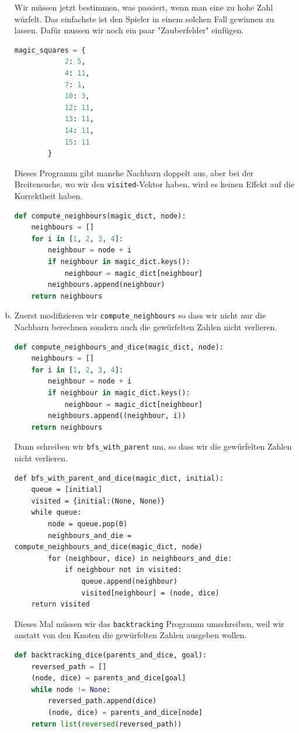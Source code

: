 \begin{enumerate}[(a)]
    Wir müssen jetzt bestimmen, was passiert, wenn man eine zu hohe Zahl würfelt. Das einfachste ist den Spieler in einem solchen Fall gewinnen zu lassen. Dafür mussen wir noch ein paar "Zauberfelder" einfügen.
    \begin{lstlisting}[language=Python]
        magic_squares = {
            2: 5,
            4: 11,
            7: 1,
            10: 3,
            12: 11,
            13: 11,
            14: 11,
            15: 11
        }
    \end{lstlisting}
    Dieses Programm gibt manche Nachbarn doppelt aus, aber bei der Breitensuche, wo wir den \texttt{visited}-Vektor haben, wird es keinen Effekt auf die Korrektheit haben.
    \begin{lstlisting}[language=Python]
    def compute_neighbours(magic_dict, node):
    neighbours = []
    for i in [1, 2, 3, 4]:
        neighbour = node + i
        if neighbour in magic_dict.keys():
            neighbour = magic_dict[neighbour]
        neighbours.append(neighbour)
    return neighbours
    \end{lstlisting}{}
    
    \item Zuerst modifizieren wir \texttt{compute\_neighbours} so dass wir nicht nur die Nachbarn berechnen sondern auch die gewürfelten Zahlen nicht verlieren.
    \begin{lstlisting}[language=Python]
def compute_neighbours_and_dice(magic_dict, node):
    neighbours = []
    for i in [1, 2, 3, 4]:
        neighbour = node + i
        if neighbour in magic_dict.keys():
            neighbour = magic_dict[neighbour]
        neighbours.append((neighbour, i))
    return neighbours
    \end{lstlisting}
    
    Dann schreiben wir \texttt{bfs\_with\_parent} um, so dass wir die gewürfelten Zahlen nicht verlieren.
    \begin{lstlisting}
def bfs_with_parent_and_dice(magic_dict, initial):
    queue = [initial]
    visited = {initial:(None, None)}
    while queue:
        node = queue.pop(0)
        neighbours_and_die = compute_neighbours_and_dice(magic_dict, node)
        for (neighbour, dice) in neighbours_and_die:
            if neighbour not in visited:
                queue.append(neighbour)
                visited[neighbour] = (node, dice)
    return visited
    \end{lstlisting}
    
    Dieses Mal müssen wir das \texttt{backtracking} Programm umschreiben, weil wir anstatt von den Knoten die gewürfelten Zahlen ausgeben wollen.
    \begin{lstlisting}[language=Python]
def backtracking_dice(parents_and_dice, goal):
    reversed_path = []
    (node, dice) = parents_and_dice[goal]
    while node != None:
        reversed_path.append(dice)
        (node, dice) = parents_and_dice[node]
    return list(reversed(reversed_path))
    \end{lstlisting}
    

\end{enumerate}
